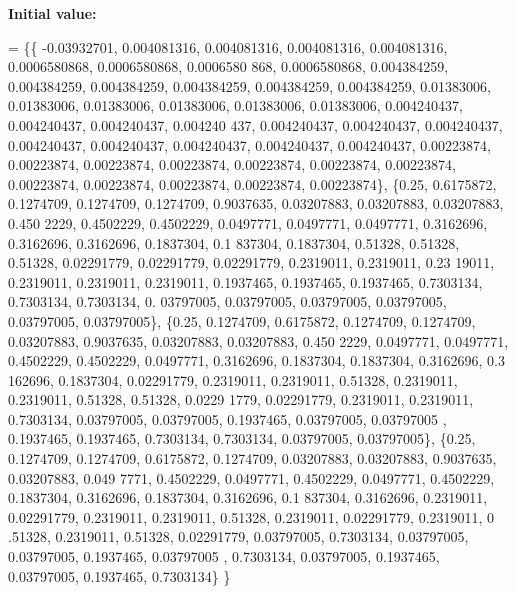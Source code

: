 {\bfseries Initial value\+:}
\begin{DoxyCode}
= \{\{ -0.03932701, 0.004081316, 0.004081316, 0.004081316, 0.004081316, 0.0006580868, 0.0006580868, 0.0006580
      868, 0.0006580868, 0.004384259, 0.004384259, 0.004384259, 0.004384259, 0.004384259, 0.004384259, 0.01383006,
       0.01383006, 0.01383006, 0.01383006, 0.01383006, 0.01383006, 0.004240437, 0.004240437, 0.004240437, 0.004240
      437, 0.004240437, 0.004240437, 0.004240437, 0.004240437, 0.004240437, 0.004240437, 0.004240437, 0.004240437,
       0.00223874, 0.00223874, 0.00223874, 0.00223874, 0.00223874, 0.00223874, 0.00223874, 0.00223874, 0.00223874,
       0.00223874, 0.00223874, 0.00223874\},
    \{0.25, 0.6175872, 0.1274709, 0.1274709, 0.1274709, 0.9037635, 0.03207883, 0.03207883, 0.03207883, 0.450
      2229, 0.4502229, 0.4502229, 0.0497771, 0.0497771, 0.0497771, 0.3162696, 0.3162696, 0.3162696, 0.1837304, 0.1
      837304, 0.1837304, 0.51328, 0.51328, 0.51328, 0.02291779, 0.02291779, 0.02291779, 0.2319011, 0.2319011, 0.23
      19011, 0.2319011, 0.2319011, 0.2319011, 0.1937465, 0.1937465, 0.1937465, 0.7303134, 0.7303134, 0.7303134, 0.
      03797005, 0.03797005, 0.03797005, 0.03797005, 0.03797005, 0.03797005\},
    \{0.25, 0.1274709, 0.6175872, 0.1274709, 0.1274709, 0.03207883, 0.9037635, 0.03207883, 0.03207883, 0.450
      2229, 0.0497771, 0.0497771, 0.4502229, 0.4502229, 0.0497771, 0.3162696, 0.1837304, 0.1837304, 0.3162696, 0.3
      162696, 0.1837304, 0.02291779, 0.2319011, 0.2319011, 0.51328, 0.2319011, 0.2319011, 0.51328, 0.51328, 0.0229
      1779, 0.02291779, 0.2319011, 0.2319011, 0.7303134, 0.03797005, 0.03797005, 0.1937465, 0.03797005, 0.03797005
      , 0.1937465, 0.1937465, 0.7303134, 0.7303134, 0.03797005, 0.03797005\},
    \{0.25, 0.1274709, 0.1274709, 0.6175872, 0.1274709, 0.03207883, 0.03207883, 0.9037635, 0.03207883, 0.049
      7771, 0.4502229, 0.0497771, 0.4502229, 0.0497771, 0.4502229, 0.1837304, 0.3162696, 0.1837304, 0.3162696, 0.1
      837304, 0.3162696, 0.2319011, 0.02291779, 0.2319011, 0.2319011, 0.51328, 0.2319011, 0.02291779, 0.2319011, 0
      .51328, 0.2319011, 0.51328, 0.02291779, 0.03797005, 0.7303134, 0.03797005, 0.03797005, 0.1937465, 0.03797005
      , 0.7303134, 0.03797005, 0.1937465, 0.03797005, 0.1937465, 0.7303134\}
  \}
\end{DoxyCode}
\mbox{\label{classfemus_1_1tet__gauss_ac81697bdebb713a26af722e439b4c6f7}} 
